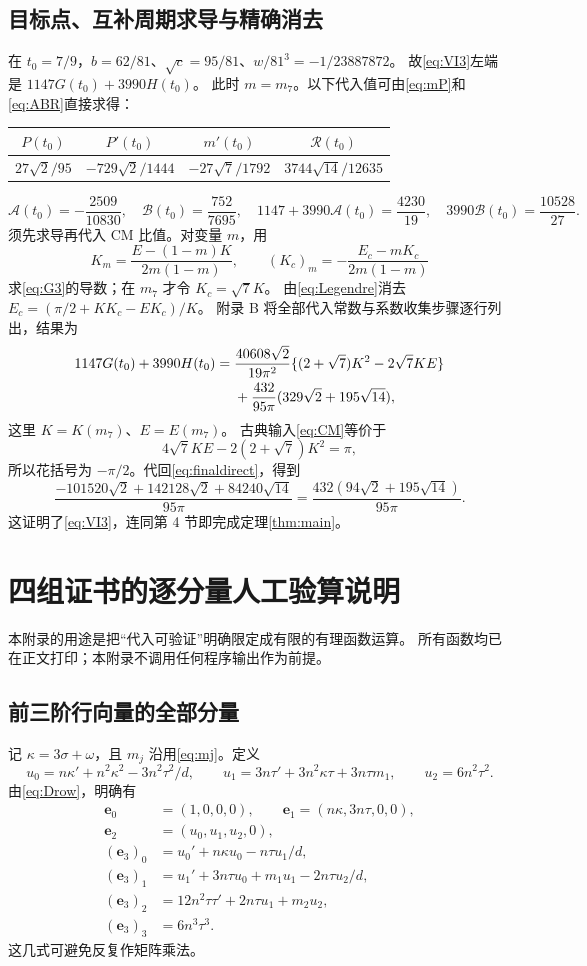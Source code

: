 \documentclass[11pt,a4paper]{article}
\numberwithin{equation}{section}
\theoremstyle{remark}\newtheorem{remark}[theorem]{说明}
\newcommand{\ee}{\boldsymbol e}
\newcommand{\RR}{\mathcal R}
\newcommand{\Afun}{\mathcal A}
\newcommand{\BB}{\mathcal B}
\begin{document}
\subsection{目标点、互补周期求导与精确消去}
在 $t_0=7/9$，$b=62/81$、$\sqrt c=95/81$、$w/81^3=-1/23887872$。
故\eqref{eq:VI3}左端是 $1147G(t_0)+3990H(t_0)$。
此时 $m=m_7$。以下代入值可由\eqref{eq:mP}和\eqref{eq:ABR}直接求得：
\begin{center}\begin{tabular}{c c c c}\toprule
 $P(t_0)$ & $P'(t_0)$ & $m'(t_0)$ & $\RR(t_0)$\\\midrule
 $27\sqrt2/95$ & $-729\sqrt2/1444$ & $-27\sqrt7/1792$ & $3744\sqrt{14}/12635$\\\bottomrule
\end{tabular}\end{center}
\[
 \Afun(t_0)=-\frac{2509}{10830},\quad
 \BB(t_0)=\frac{752}{7695},\quad
 1147+3990\Afun(t_0)=\frac{4230}{19},\quad
 3990\BB(t_0)=\frac{10528}{27}.
\]
须先求导再代入 CM 比值。对变量 $m$，用
\[
 K_m=\frac{E-(1-m)K}{2m(1-m)},\qquad
 (K_c)_m=-\frac{E_c-mK_c}{2m(1-m)}
\]
求\eqref{eq:G3}的导数；在 $m_7$ 才令 $K_c=\sqrt7K$。
由\eqref{eq:Legendre}消去
$E_c=(\pi/2+KK_c-EK_c)/K$。
附录 B 将全部代入常数与系数收集步骤逐行列出，结果为
\begin{align}\label{eq:finaldirect}
 1147G(t_0)+3990H(t_0)
 ={}&\frac{40608\sqrt2}{19\pi^2}\{(2+\sqrt7)K^2-2\sqrt7KE\}\notag\\
 &+\frac{432}{95\pi}(329\sqrt2+195\sqrt{14}),
\end{align}
这里 $K=K(m_7)$、$E=E(m_7)$。
古典输入\eqref{eq:CM}等价于
\[
 4\sqrt7KE-2(2+\sqrt7)K^2=\pi,
\]
所以花括号为 $-\pi/2$。代回\eqref{eq:finaldirect}，得到
\[
 \frac{-101520\sqrt2+142128\sqrt2+84240\sqrt{14}}{95\pi}
 =\frac{432(94\sqrt2+195\sqrt{14})}{95\pi}.
\]
这证明了\eqref{eq:VI3}，连同第 4 节即完成定理\ref{thm:main}。

\appendix
\section{四组证书的逐分量人工验算说明}\label{app:cert}
本附录的用途是把“代入可验证”明确限定成有限的有理函数运算。
所有函数均已在正文打印；本附录不调用任何程序输出作为前提。

\subsection{前三阶行向量的全部分量}
记 $\kappa=3\sigma+\omega$，且 $m_j$ 沿用\eqref{eq:mj}。定义
\[
 u_0=n\kappa'+n^2\kappa^2-3n^2\tau^2/d,\qquad
 u_1=3n\tau'+3n^2\kappa\tau+3n\tau m_1,\qquad
 u_2=6n^2\tau^2.
\]
由\eqref{eq:Drow}，明确有
\begin{align*}
 \ee_0&=(1,0,0,0),\qquad \ee_1=(n\kappa,3n\tau,0,0),\\
 \ee_2&=(u_0,u_1,u_2,0),\\
 (\ee_3)_0&=u_0'+n\kappa u_0-n\tau u_1/d,\\
 (\ee_3)_1&=u_1'+3n\tau u_0+m_1u_1-2n\tau u_2/d,\\
 (\ee_3)_2&=12n^2\tau\tau'+2n\tau u_1+m_2u_2,\\
 (\ee_3)_3&=6n^3\tau^3.
\end{align*}
这几式可避免反复作矩阵乘法。
\end{document}
